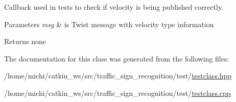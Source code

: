 Callback used in tests to check if velocity is being published correctly. 


\begin{DoxyParams}{Parameters}
{\em msg} & is Twist message with velocity type information \\
\hline
\end{DoxyParams}
\begin{DoxyReturn}{Returns}
none 
\end{DoxyReturn}


The documentation for this class was generated from the following files\+:\begin{DoxyCompactItemize}
\item 
/home/michi/catkin\+\_\+ws/src/traffic\+\_\+sign\+\_\+recognition/test/\hyperlink{testclass_8hpp}{testclass.\+hpp}\item 
/home/michi/catkin\+\_\+ws/src/traffic\+\_\+sign\+\_\+recognition/test/\hyperlink{testclass_8cpp}{testclass.\+cpp}\end{DoxyCompactItemize}
